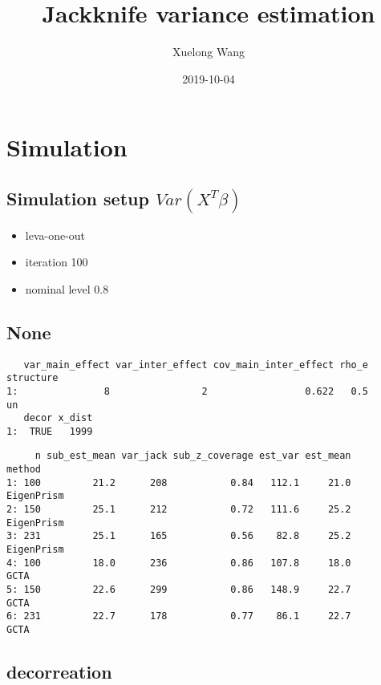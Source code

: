 \documentclass[]{article}
\title{Jackknife variance estimation}
\author{Xuelong Wang}
\date{2019-10-04}
\providecommand{\tightlist}{%
  \setlength{\itemsep}{0pt}\setlength{\parskip}{0pt}}
\begin{document}
\maketitle

{
\setcounter{tocdepth}{2}
\tableofcontents
}
\section{Simulation}\label{simulation}

\subsection{\texorpdfstring{Simulation setup
\(Var(X^T\beta)\)}{Simulation setup Var(X\^{}T\textbackslash{}beta)}}\label{simulation-setup-varxtbeta}

\begin{itemize}
\tightlist
\item
  leva-one-out
\item
  iteration 100
\item
  nominal level 0.8
\end{itemize}

\subsection{None}\label{none}

\begin{verbatim}
   var_main_effect var_inter_effect cov_main_inter_effect rho_e structure
1:               8                2                 0.622   0.5        un
   decor x_dist
1:  TRUE   1999
\end{verbatim}

\begin{verbatim}
     n sub_est_mean var_jack sub_z_coverage est_var est_mean     method
1: 100         21.2      208           0.84   112.1     21.0 EigenPrism
2: 150         25.1      212           0.72   111.6     25.2 EigenPrism
3: 231         25.1      165           0.56    82.8     25.2 EigenPrism
4: 100         18.0      236           0.86   107.8     18.0       GCTA
5: 150         22.6      299           0.86   148.9     22.7       GCTA
6: 231         22.7      178           0.77    86.1     22.7       GCTA
\end{verbatim}

\subsection{decorreation}\label{decorreation}
\end{document}
